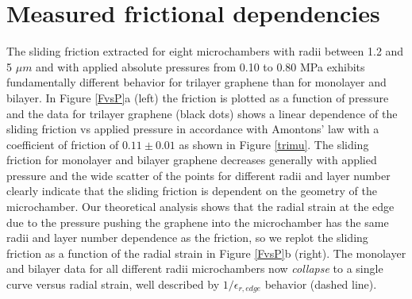 \section{Measured frictional dependencies}
The sliding friction extracted for eight microchambers with radii between 1.2 and 5 $\mu m$ and with applied absolute pressures from 0.10 to 0.80 MPa exhibits fundamentally different behavior for trilayer graphene than for monolayer and bilayer.  In Figure \ref{FvsP}a (left) the friction is plotted as a function of pressure and the data for trilayer graphene (black dots) shows a linear dependence of the sliding friction vs applied pressure in accordance with Amontons' law with a coefficient of friction of $0.11 \pm 0.01$ as shown in Figure \ref{trimu}.  The sliding friction for monolayer and bilayer graphene decreases generally with applied pressure and the wide scatter of the points for different radii and layer number clearly indicate that the sliding friction is dependent on the geometry of the microchamber. Our theoretical analysis shows that the radial strain at the edge due to the pressure pushing the graphene into the microchamber has the same radii and layer number dependence as the friction, so we replot the sliding friction as a function of the radial strain in Figure \ref{FvsP}b (right). The monolayer and bilayer data for all different radii microchambers now \emph{collapse} to a single curve versus radial strain, well described by $1/\epsilon_{r,edge}$ behavior (dashed line). 

